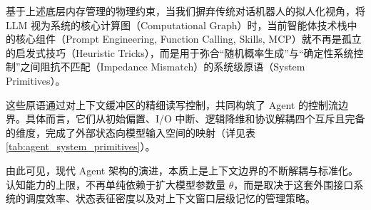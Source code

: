 基于上述底层内存管理的物理约束，当我们摒弃传统对话机器人的拟人化视角，将 LLM 视为系统的核心计算图（Computational Graph）时，当前智能体技术栈中的核心组件（Prompt Engineering, Function Calling, Skills, MCP）就不再是孤立的启发式技巧（Heuristic Tricks），而是用于弥合“随机概率生成”与“确定性系统控制”之间阻抗不匹配（Impedance Mismatch）的系统级原语（System Primitives）。

这些原语通过对上下文缓冲区的精细读写控制，共同构筑了 Agent 的控制流边界。具体而言，它们从初始偏置、I/O 中断、逻辑降维和协议解耦四个互斥且完备的维度，完成了外部状态向模型输入空间的映射（详见表 \ref{tab:agent_system_primitives}）。



由此可见，现代 Agent 架构的演进，本质上是上下文边界的不断解耦与标准化。认知能力的上限，不再单纯依赖于扩大模型参数量 $\theta$，而是取决于这套外围接口系统的调度效率、状态表征密度以及对上下文窗口层级记忆的管理策略。